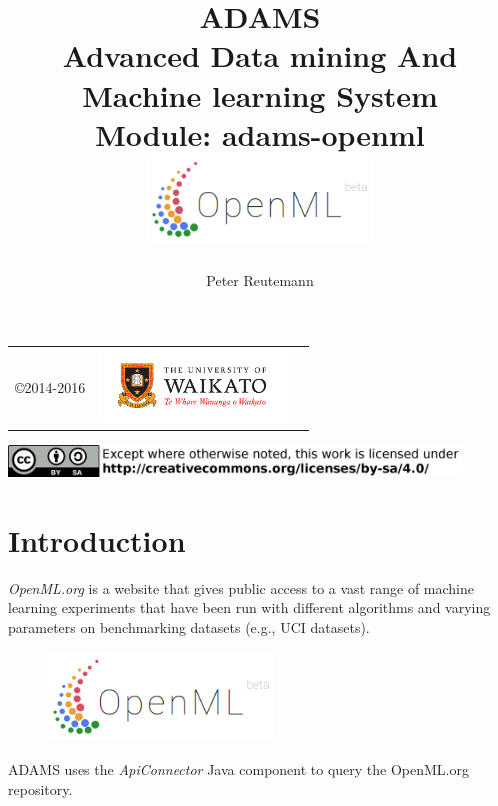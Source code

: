 \documentclass[a4paper]{book}
\title{
  \textbf{ADAMS} \\
  {\Large \textbf{A}dvanced \textbf{D}ata mining \textbf{A}nd \textbf{M}achine
  learning \textbf{S}ystem} \\
  {\Large Module: adams-openml} \\
  \vspace{1cm}
  \includegraphics[width=6cm]{images/openml-module.png} \\
}
\author{
  Peter Reutemann
}
\begin{document}
\begin{titlepage}
\maketitle

\thispagestyle{empty}
\center
\begin{table}[b]
	\begin{tabular}{c l l}
		\parbox[c][2cm]{2cm}{\copyright 2014-2016} &
		\parbox[c][2cm]{5cm}{\includegraphics[width=5cm]{images/coat_of_arms.pdf}} \\
	\end{tabular}
	\includegraphics[width=12cm]{images/cc.png} \\
\end{table}

\end{titlepage}

\tableofcontents
\listoffigures

\chapter{Introduction}
\textit{OpenML.org}\cite{openml} is a website that gives public access to a vast range of machine learning experiments that have been run with different algorithms and varying parameters on benchmarking datasets (e.g., UCI datasets).

\begin{figure}[htb]
  \centering
  \includegraphics[width=6.0cm]{images/openml-module.png}
  \label{openml-module}
\end{figure}

ADAMS uses the \textit{ApiConnector} Java component \cite{apiconnector} to query the OpenML.org repository.

\end{document}

